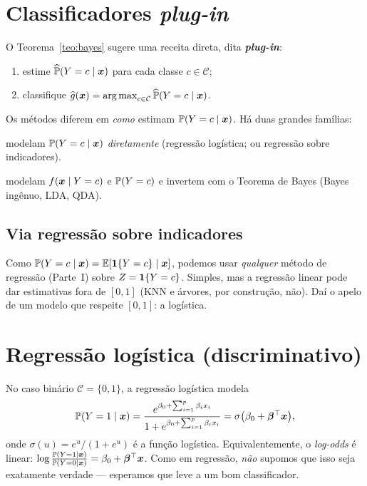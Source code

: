 \documentclass[11pt,a4paper]{article}
\begin{document}
\section{Classificadores \emph{plug-in}}
O Teorema~\ref{teo:bayes} sugere uma receita direta, dita \textbf{\emph{plug-in}}:
\begin{enumerate}[leftmargin=1.6cm,nosep]
  \item estime $\widehat{\mathbb{P}}(Y=c\mid\bm{x})$ para cada classe $c\in\mathcal{C}$;
  \item classifique $\ghat(\x)=\argmax_{c\in\mathcal{C}}\widehat\Prob(Y=c\mid\x)$.
\end{enumerate}
Os métodos diferem em \emph{como} estimam $\mathbb{P}(Y=c\mid\bm{x})$. Há duas grandes
famílias:
\begin{description}[leftmargin=2.6cm,style=nextline]
  \item[Discriminativos] modelam $\mathbb{P}(Y=c\mid\bm{x})$ \emph{diretamente} (regressão
        logística; ou regressão sobre indicadores).
  \item[Generativos] modelam $f(\bm{x}\mid Y=c)$ e $\mathbb{P}(Y=c)$ e invertem com o
        Teorema de Bayes (Bayes ingênuo, LDA, QDA).
\end{description}

\subsection{Via regressão sobre indicadores}
Como $\mathbb{P}(Y=c\mid\bm{x})=\mathbb{E}[\mathbf{1}\!\left\{Y=c\right\}\mid\bm{x}]$, podemos usar \emph{qualquer} método de
regressão (Parte~I) sobre $Z=\mathbf{1}\!\left\{Y=c\right\}$. Simples, mas a regressão linear pode dar
estimativas fora de $[0,1]$ (KNN e árvores, por construção, não). Daí o apelo de um
modelo que respeite $[0,1]$: a logística.

\section{Regressão logística (discriminativo)}
No caso binário $\mathcal{C}=\{0,1\}$, a regressão logística modela
\begin{equation}\label{eq:logit}
  \mathbb{P}(Y=1\mid\bm{x}) = \frac{e^{\beta_0+\sum_{i=1}^p\beta_i x_i}}
                          {1+e^{\beta_0+\sum_{i=1}^p\beta_i x_i}}
  = \sigma\big(\beta_0+\bm{\beta}^\top\bm{x}\big),
\end{equation}
onde $\sigma(u)=e^u/(1+e^u)$ é a função logística. Equivalentemente, o
\emph{log-odds} é linear: $\log\frac{\mathbb{P}(Y=1\mid\bm{x})}{\mathbb{P}(Y=0\mid\bm{x})}
=\beta_0+\bm{\beta}^\top\bm{x}$. Como em regressão, \emph{não} supomos que isso seja
exatamente verdade --- esperamos que leve a um bom classificador.
\end{document}
